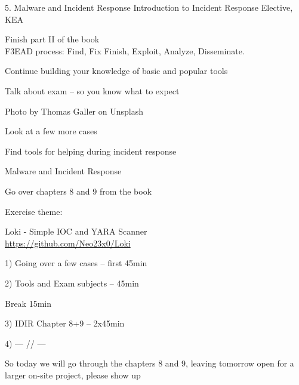 \documentclass[Screen16to9,17pt]{foils}
\begin{document}
\mytitlepage
{5. Malware and Incident Response}
{Introduction to Incident Response Elective, KEA}




\begin{list2}
\item Finish part II of the book\\
F3EAD process: Find, Fix Finish, Exploit, Analyze, Disseminate.
\item Continue building your knowledge of basic and popular tools
\item Talk about exam -- so you know what to expect
\end{list2}

{\hfill \small Photo by Thomas Galler on Unsplash}


\begin{list2}
\item Look at a few more cases
\item Find tools for helping during incident response
\item Malware and Incident Response
\item Go over chapters 8 and 9 from the book
\end{list2}

Exercise theme:
\begin{list2}
\item Loki - Simple IOC and YARA Scanner\\
\url{https://github.com/Neo23x0/Loki}
\end{list2}




\begin{list2}
\item 1) Going over a few cases -- first 45min
\item 2) Tools and Exam subjects -- 45min
\item Break 15min
\item 3) IDIR Chapter 8+9 -- 2x45min
\item 4) --- // ---
\end{list2}

So today we will go through the chapters 8 and 9, leaving tomorrow open for a larger on-site project, please show up
\end{document}
